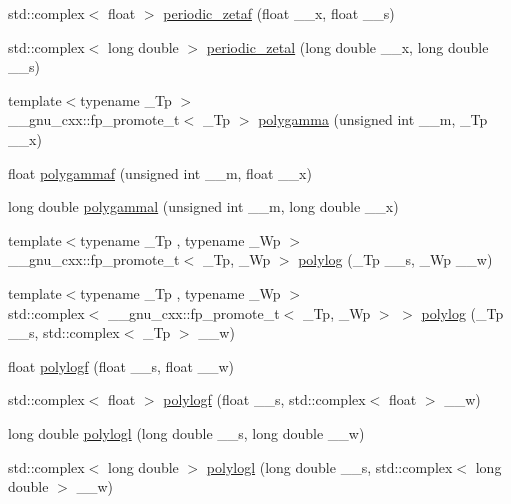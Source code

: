 \begin{DoxyCompactItemize}
\item 
std\+::complex$<$ float $>$ \hyperlink{group__mathsf__gnu_ga1308c2a5d1b263757485cb48eb2c19ff}{periodic\+\_\+zetaf} (float \+\_\+\+\_\+x, float \+\_\+\+\_\+s)
\item 
std\+::complex$<$ long double $>$ \hyperlink{group__mathsf__gnu_gab7573fb57ebaabac4432bb5e6b525151}{periodic\+\_\+zetal} (long double \+\_\+\+\_\+x, long double \+\_\+\+\_\+s)
\item 
{\footnotesize template$<$typename \+\_\+\+Tp $>$ }\\\+\_\+\+\_\+gnu\+\_\+cxx\+::fp\+\_\+promote\+\_\+t$<$ \+\_\+\+Tp $>$ \hyperlink{group__mathsf__gnu_ga65e674e7fe1457e819897e0d608c18b8}{polygamma} (unsigned int \+\_\+\+\_\+m, \+\_\+\+Tp \+\_\+\+\_\+x)
\item 
float \hyperlink{group__mathsf__gnu_ga91861fadef76d4f73afacffcac66e312}{polygammaf} (unsigned int \+\_\+\+\_\+m, float \+\_\+\+\_\+x)
\item 
long double \hyperlink{group__mathsf__gnu_gaa6a37359a97ba43f32aa842705c416d4}{polygammal} (unsigned int \+\_\+\+\_\+m, long double \+\_\+\+\_\+x)
\item 
{\footnotesize template$<$typename \+\_\+\+Tp , typename \+\_\+\+Wp $>$ }\\\+\_\+\+\_\+gnu\+\_\+cxx\+::fp\+\_\+promote\+\_\+t$<$ \+\_\+\+Tp, \+\_\+\+Wp $>$ \hyperlink{group__mathsf__gnu_gabcc5480ad739561c2debd6a8a352084f}{polylog} (\+\_\+\+Tp \+\_\+\+\_\+s, \+\_\+\+Wp \+\_\+\+\_\+w)
\item 
{\footnotesize template$<$typename \+\_\+\+Tp , typename \+\_\+\+Wp $>$ }\\std\+::complex$<$ \+\_\+\+\_\+gnu\+\_\+cxx\+::fp\+\_\+promote\+\_\+t$<$ \+\_\+\+Tp, \+\_\+\+Wp $>$ $>$ \hyperlink{group__mathsf__gnu_ga817a208972a0200b667c68d199176d70}{polylog} (\+\_\+\+Tp \+\_\+\+\_\+s, std\+::complex$<$ \+\_\+\+Tp $>$ \+\_\+\+\_\+w)
\item 
float \hyperlink{group__mathsf__gnu_ga5bcdd35473144a6d8efc258a79bc82d8}{polylogf} (float \+\_\+\+\_\+s, float \+\_\+\+\_\+w)
\item 
std\+::complex$<$ float $>$ \hyperlink{group__mathsf__gnu_ga5376edb72358b777035a78b929deb49f}{polylogf} (float \+\_\+\+\_\+s, std\+::complex$<$ float $>$ \+\_\+\+\_\+w)
\item 
long double \hyperlink{group__mathsf__gnu_ga3aa007b4b4e345c30be015ab145d5598}{polylogl} (long double \+\_\+\+\_\+s, long double \+\_\+\+\_\+w)
\item 
std\+::complex$<$ long double $>$ \hyperlink{group__mathsf__gnu_ga9eb79e506eda210610bc59c1912b4d0f}{polylogl} (long double \+\_\+\+\_\+s, std\+::complex$<$ long double $>$ \+\_\+\+\_\+w)

\end{DoxyCompactItemize}
